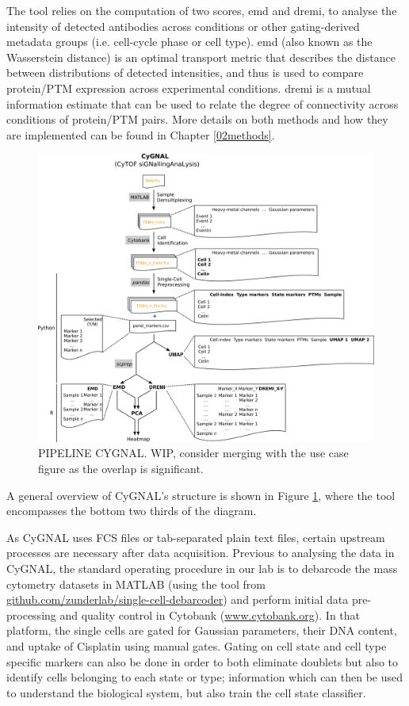 The tool relies on the computation of two scores, \acrfull{emd} and \acrfull{dremi}, to analyse the intensity of detected antibodies across conditions or other gating-derived metadata groups (i.e. cell-cycle phase or cell type). \acrshort{emd} (also known as the Wasserstein distance) is an optimal transport metric that describes the distance between distributions of detected intensities, and thus is used to compare protein/PTM expression across experimental conditions. \acrshort{dremi} is a mutual information estimate that can be used to relate the degree of connectivity across conditions of protein/PTM pairs. More details on both methods and how they are implemented can be found in Chapter \ref{02methods}.

\begin{figure}
    \centering
    \includegraphics{03cytof/figs/3CYGNAL_pipeline.png}
    \caption{PIPELINE CYGNAL. WIP, consider merging with the use case figure as the overlap is significant.}
    \label{fig:3cygpipe}
\end{figure}

A general overview of CyGNAL's structure is shown in Figure \ref{fig:3cygpipe}, where the tool encompasses the bottom two thirds of the diagram.

As CyGNAL uses FCS files or tab-separated plain text files, certain upstream processes are necessary after data acquisition. Previous to analysing the data in CyGNAL, the standard operating procedure in our lab is to debarcode the mass cytometry datasets in MATLAB (using the tool from \href{github.com/zunderlab/single-cell-debarcoder}{github.com/zunderlab/single-cell-debarcoder}) and perform initial data pre-processing and quality control in Cytobank (\href{www.cytobank.org}{www.cytobank.org}). In that platform, the single cells are gated for Gaussian parameters, their DNA content, and uptake of Cisplatin using manual gates. Gating on cell state and cell type specific markers can also be done in order to both eliminate doublets but also to identify cells belonging to each state or type; information which can then be used to understand the biological system, but also train the cell state classifier.


